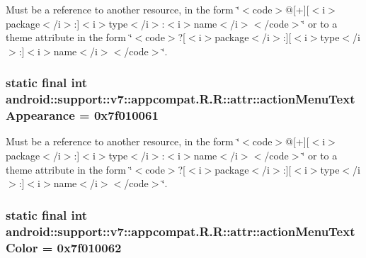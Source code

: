 Must be a reference to another resource, in the form \char`\"{}$<$code$>$@\mbox{[}+\mbox{]}\mbox{[}$<$i$>$package$<$/i$>$:\mbox{]}$<$i$>$type$<$/i$>$:$<$i$>$name$<$/i$>$$<$/code$>$\char`\"{} or to a theme attribute in the form \char`\"{}$<$code$>$?\mbox{[}$<$i$>$package$<$/i$>$:\mbox{]}\mbox{[}$<$i$>$type$<$/i$>$:\mbox{]}$<$i$>$name$<$/i$>$$<$/code$>$\char`\"{}. \hypertarget{classandroid_1_1support_1_1v7_1_1appcompat_1_1_r_1_1attr_c7d3dd94507cfe6d8335391985afc5e0}{
\subsubsection[{actionMenuTextAppearance}]{\setlength{\rightskip}{0pt plus 5cm}static final int android::support::v7::appcompat.R.R::attr::actionMenuTextAppearance = 0x7f010061}}
\label{classandroid_1_1support_1_1v7_1_1appcompat_1_1_r_1_1attr_c7d3dd94507cfe6d8335391985afc5e0}


Must be a reference to another resource, in the form \char`\"{}$<$code$>$@\mbox{[}+\mbox{]}\mbox{[}$<$i$>$package$<$/i$>$:\mbox{]}$<$i$>$type$<$/i$>$:$<$i$>$name$<$/i$>$$<$/code$>$\char`\"{} or to a theme attribute in the form \char`\"{}$<$code$>$?\mbox{[}$<$i$>$package$<$/i$>$:\mbox{]}\mbox{[}$<$i$>$type$<$/i$>$:\mbox{]}$<$i$>$name$<$/i$>$$<$/code$>$\char`\"{}. \hypertarget{classandroid_1_1support_1_1v7_1_1appcompat_1_1_r_1_1attr_25d96f759cca10b9c41c39bd1405188e}{
\subsubsection[{actionMenuTextColor}]{\setlength{\rightskip}{0pt plus 5cm}static final int android::support::v7::appcompat.R.R::attr::actionMenuTextColor = 0x7f010062}}
\label{classandroid_1_1support_1_1v7_1_1appcompat_1_1_r_1_1attr_25d96f759cca10b9c41c39bd1405188e}


